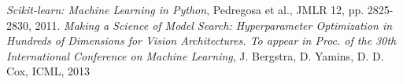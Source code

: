 \documentclass[a4paper, oneside]{book}
\begin{document}
\begin{thebibliography}{32}
			
			\textit{Scikit-learn: Machine Learning in Python}, Pedregosa et al., JMLR 12, pp. 2825-2830, 2011.
			\textit{Making a Science of Model Search: Hyperparameter Optimization in Hundreds of Dimensions for Vision Architectures. To appear in Proc. of the 30th International Conference on Machine Learning}, J. Bergstra, D. Yamins, D. D. Cox, ICML, 2013
			
	\end{thebibliography}
\end{document}

